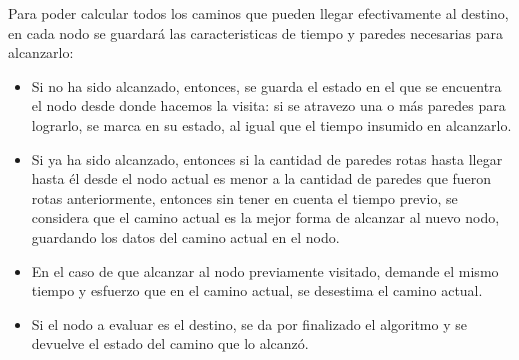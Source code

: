 Para poder calcular todos los caminos que pueden llegar efectivamente al destino, en cada nodo se guardará las caracteristicas de tiempo y paredes necesarias para alcanzarlo:
\begin{itemize}
\item Si no ha sido alcanzado, entonces, se guarda el estado en el que se encuentra el nodo desde donde hacemos la visita: si se atravezo una o más paredes para lograrlo, se marca en su estado, al igual que el tiempo insumido en alcanzarlo.
\item Si ya ha sido alcanzado, entonces si la cantidad de paredes rotas hasta llegar hasta él desde el nodo actual es menor a la cantidad de paredes que fueron rotas anteriormente, entonces sin tener en cuenta el tiempo previo, se considera que el camino actual es la mejor forma de alcanzar al nuevo nodo, guardando los datos del camino actual en el nodo.
\item En el caso de que alcanzar al nodo previamente visitado, demande el mismo tiempo y esfuerzo que en el camino actual, se desestima el camino actual.
\item Si el nodo a evaluar es el destino, se da por finalizado el algoritmo y se devuelve el estado del camino que lo alcanzó.
\end{itemize}